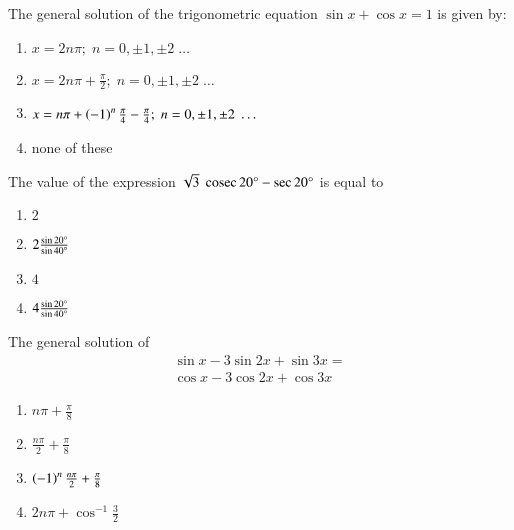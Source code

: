 \iffalse
  \title{Trignometric Functions and Equations}
  \author{EE24BTECH11002 - AGAMJOT SINGH}
  \section{mcq-single}
\fi
    \item The general solution of the trigonometric equation $\sin {x} + \cos{x} = 1$ is given by:
        \hfill{}
        \begin{enumerate}
            \item $x = 2n\pi;\;n = 0,\pm1,\pm2\;\dots$
            \item $x = 2n\pi+\frac{\pi}{2};\;n = 0,\pm1,\pm2\;\dots$
            \item $x = n\pi+\left(-1\right)^n\frac{\pi}{4}-\frac{\pi}{4};\;n = 0,\pm1,\pm2\;\dots$
            \item none of these
        \end{enumerate}

    \item The value of the expression $\sqrt{3}\;\,\text{cosec}\,{20\degree}-\sec{20\degree}$ is equal to
        \hfill{}
        \begin{enumerate}
                \item $2$
                \item $2\frac{\sin{20\degree}}{\sin{40\degree}}$
                \item $4$
                \item $4\frac{\sin{20\degree}}{\sin{40\degree}}$
        \end{enumerate}

    \item The general solution of 
	\begin{multline*}
		    \sin{x}-3\sin{2x} + \sin{3x} = \\\cos{x}-3\cos{2x} + \cos{3x}
	\end{multline*}
        
        \hfill{}
        \begin{enumerate}
                \item $n\pi+\frac{\pi}{8}$
                \item $\frac{n\pi}{2}+\frac{\pi}{8}$
                \item $\left(-1\right)^n\frac{n\pi}{2}+\frac{\pi}{8}$
                \item $2n\pi+\cos^{-1}{\frac{3}{2}}$
        \end{enumerate}


